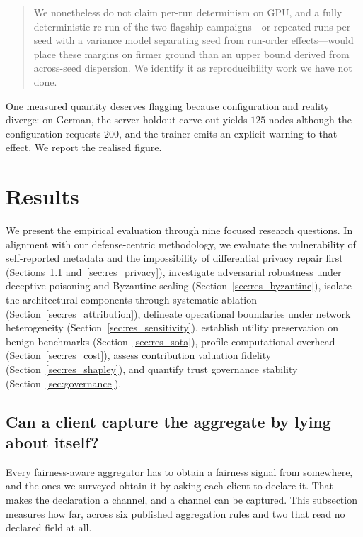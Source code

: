 \documentclass[preprint,12pt]{elsarticle}
\theoremstyle{plain}
\theoremstyle{definition}
\theoremstyle{remark}
\begin{document}
\begin{quote}
We nonetheless do not claim per-run determinism on GPU, and a fully deterministic re-run of the two flagship campaigns---or repeated runs per seed with a variance model separating seed from run-order effects---would place these margins on firmer ground than an upper bound derived from across-seed dispersion. We identify it as reproducibility work we have not done.
\end{quote}

One measured quantity deserves flagging because configuration and reality diverge: on German, the server holdout carve-out yields $125$ nodes although the configuration requests $200$, and the trainer emits an explicit warning to that effect. We report the realised figure.%
\section{Results}
\label{sec:results}

We present the empirical evaluation through nine focused research questions. In alignment with our defense-centric methodology, we evaluate the vulnerability of self-reported metadata and the impossibility of differential privacy repair first (Sections~\ref{sec:res_metadata} and~\ref{sec:res_privacy}), investigate adversarial robustness under deceptive poisoning and Byzantine scaling (Section~\ref{sec:res_byzantine}), isolate the architectural components through systematic ablation (Section~\ref{sec:res_attribution}), delineate operational boundaries under network heterogeneity (Section~\ref{sec:res_sensitivity}), establish utility preservation on benign benchmarks (Section~\ref{sec:res_sota}), profile computational overhead (Section~\ref{sec:res_cost}), assess contribution valuation fidelity (Section~\ref{sec:res_shapley}), and quantify trust governance stability (Section~\ref{sec:governance}).

\subsection{Can a client capture the aggregate by lying about itself?}
\label{sec:res_metadata}




Every fairness-aware aggregator has to obtain a fairness signal from somewhere, and the ones we surveyed obtain it by asking each client to declare it. That makes the declaration a channel, and a channel can be captured. This subsection measures how far, across six published aggregation rules and two that read no declared field at all.
\end{document}
